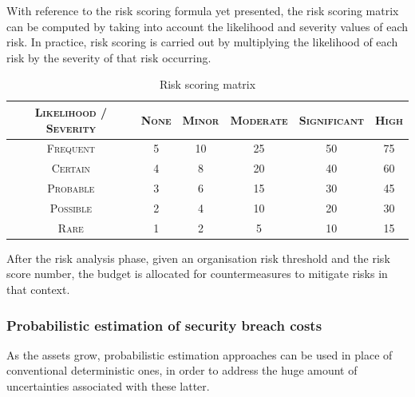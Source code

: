 With reference to the risk scoring formula yet presented, the risk scoring matrix can be computed by taking into account the likelihood and severity values of each risk.
In practice, risk scoring is carried out by multiplying the likelihood of each risk by the severity of that risk occurring.

\begin{table}[H]
    \centering
    \begin{tabular}{|c|c|c|c|c|c|}
        \hline
        \textsc{Likelihood / Severity} & \textsc{None} & \textsc{Minor} & \textsc{Moderate} & \textsc{Significant} & \textsc{High} \\
        \hline
        \textsc{Frequent} & \cellcolor{yellow} 5 & \cellcolor{yellow} 10 & \cellcolor{orange} 25 & \cellcolor{red} 50 & \cellcolor{red} 75 \\
        \hline
        \textsc{Certain} & \cellcolor{green} 4 & \cellcolor{yellow} 8 & \cellcolor{orange} 20 & \cellcolor{red} 40 & \cellcolor{red} 60 \\
        \hline
        \textsc{Probable} & \cellcolor{green} 3 & \cellcolor{yellow} 6 & \cellcolor{orange} 15 & \cellcolor{orange} 30 & \cellcolor{red} 45 \\
        \hline
        \textsc{Possible} & \cellcolor{green} 2 & \cellcolor{green} 4 & \cellcolor{yellow} 10 & \cellcolor{orange} 20 & \cellcolor{orange} 30 \\
        \hline
        \textsc{Rare} & \cellcolor{green} 1 & \cellcolor{green} 2 & \cellcolor{yellow} 5 & \cellcolor{yellow} 10 & \cellcolor{orange} 15 \\
        \hline
    \end{tabular}
    \caption{Risk scoring matrix}
    \label{tab:scoring}
\end{table}

After the risk analysis phase, given an organisation risk threshold and the risk score number, the budget is allocated for countermeasures to mitigate risks in that context.


\subsubsection{Probabilistic estimation of security breach costs}
As the assets grow, probabilistic estimation approaches can be used in place of conventional deterministic ones, in order to address the huge amount of uncertainties associated with these latter.

